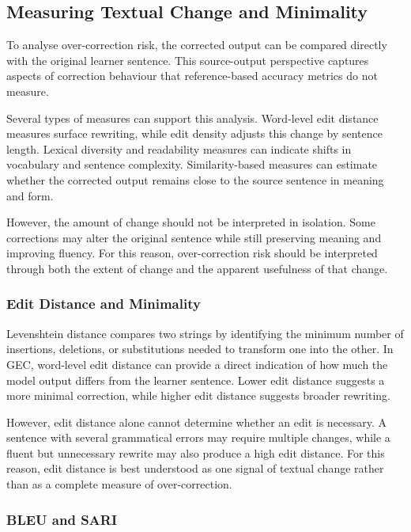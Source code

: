 \subsection{Measuring Textual Change and Minimality}

To analyse over-correction risk, the corrected output can be compared directly with the original learner sentence. This source-output perspective captures aspects of correction behaviour that reference-based accuracy metrics do not measure.

Several types of measures can support this analysis. Word-level edit distance measures surface rewriting, while edit density adjusts this change by sentence length. Lexical diversity and readability measures can indicate shifts in vocabulary and sentence complexity. Similarity-based measures can estimate whether the corrected output remains close to the source sentence in meaning and form.

However, the amount of change should not be interpreted in isolation. Some corrections may alter the original sentence while still preserving meaning and improving fluency. For this reason, over-correction risk should be interpreted through both the extent of change and the apparent usefulness of that change.

\subsubsection{Edit Distance and Minimality}

Levenshtein distance \cite{levenshtein1966binary} compares two strings by identifying the minimum number of insertions, deletions, or substitutions needed to transform one into the other. In GEC, word-level edit distance can provide a direct indication of how much the model output differs from the learner sentence. Lower edit distance suggests a more minimal correction, while higher edit distance suggests broader rewriting.

However, edit distance alone cannot determine whether an edit is necessary. A sentence with several grammatical errors may require multiple changes, while a fluent but unnecessary rewrite may also produce a high edit distance. For this reason, edit distance is best understood as one signal of textual change rather than as a complete measure of over-correction.

\subsubsection{BLEU and SARI}

